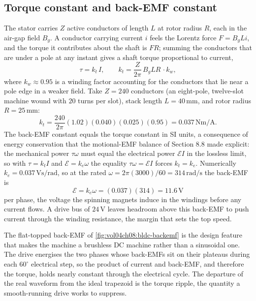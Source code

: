 \subsection{Torque constant and back-EMF constant}

The stator carries $Z$ active conductors of length $L$ at rotor radius
$R$, each in the air-gap field $B_g$. A conductor carrying current $i$
feels the Lorentz force $F = B_g L i$, and the torque it contributes about
the shaft is $F R$; summing the conductors that are under a pole at any
instant gives a shaft torque proportional to current,
\[
\tau = k_t\,I, \qquad k_t = \frac{Z}{2\pi}\,B_g L R\,\cdot k_w,
\]
where $k_w \approx 0.95$ is a winding factor accounting for the conductors
that lie near a pole edge in a weaker field. Take $Z = 240$ conductors
(an eight-pole, twelve-slot machine wound with $20$ turns per slot),
stack length $L = 40\,\si{\milli\meter}$, and rotor radius $R = 25\,\si{
\milli\meter}$:
\[
k_t = \frac{240}{2\pi}(1.02)(0.040)(0.025)(0.95) = 0.037\,\si{\newton
\meter\per\ampere}.
\]
The back-EMF constant equals the torque constant in SI units, a
consequence of energy conservation that the motional-EMF balance of
Section 8.8 made explicit: the mechanical power $\tau\omega$ must equal
the electrical power $\mathcal{E} I$ in the lossless limit, so with
$\tau = k_t I$ and $\mathcal{E} = k_e\omega$ the equality $\tau\omega =
\mathcal{E}I$ forces $k_t = k_e$. Numerically $k_e = 0.037\,\si{\volt
\second\per\radian}$, so at the rated $\omega = 2\pi(3000)/60 = 314\,\si{
\radian\per\second}$ the back-EMF is
\[
\mathcal{E} = k_e\omega = (0.037)(314) = 11.6\,\si{\volt}
\]
per phase, the voltage the spinning magnets induce in the windings before
any current flows. A drive bus of $24\,\si{\volt}$ leaves headroom above
this back-EMF to push current through the winding resistance, the margin
that sets the top speed.



The flat-topped back-EMF of \cref{fig:vol04ch08:bldc-backemf} is the
design feature that makes the machine a brushless DC machine rather than a
sinusoidal one. The drive energises the two phases whose back-EMFs sit on
their plateaus during each $60^{\circ}$ electrical step, so the product of
current and back-EMF, and therefore the torque, holds nearly constant
through the electrical cycle. The departure of the real waveform from the
ideal trapezoid is the torque ripple, the quantity a smooth-running drive
works to suppress.


